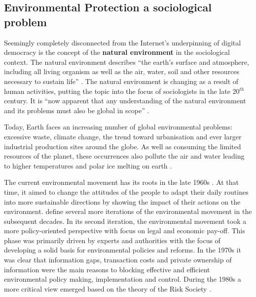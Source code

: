 \subsection{Environmental Protection a sociological problem}
\label{subsec:environmentProblems}
Seemingly completely disconnected from the Internet's underpinning of digital democracy is the concept of the \textbf{natural environment} in the sociological context. The natural environment describes ``the earth's surface and atmosphere, including all living organism as well as the air, water, soil and other resources necessary to sustain life'' \citep[pg. 869]{Plummer11}. The natural environment is changing as a result of human activities, putting the topic into the focus of sociologists in the late 20$^{th}$ century. It is ``now apparent that any understanding of the natural environment and its problems must also be global in scope'' \citep[pg. 870]{Plummer11}.\par\vspace{0.2cm}

Today, Earth faces an increasing number of global environmental problems: excessive waste, climate change, the trend toward urbanisation and ever larger industrial production sites around the globe. As well as consuming the limited resources of the planet, these occurrences also pollute the air and water leading to higher temperatures and polar ice melting on earth \citep[pg. 876ff]{Plummer11}.\par\vspace{0.2cm}

The current environmental movement has its roots in the late 1960s \citep[p. 888]{Plummer11}. At that time, it aimed to change the attitudes of the people to adapt their daily routines into more sustainable directions by showing the impact of their actions on the environment. \citet{Plummer11} define several more iterations of the environmental movement in the subsequent decades. In its second iteration, the environmental movement took a more policy-oriented perspective with focus on legal and economic pay-off. This phase was primarily driven by experts and authorities with the focus of developing a solid basis for environmental policies and reforms. In the 1970s it was clear that information gaps, transaction costs and private ownership of information were the main reasons to blocking effective and efficient environmental policy making, implementation and control. During the 1980s a more critical view emerged based on the theory of the Risk Society \citep[pg. 7f]{Mol08}.\par\vspace{0.2cm}

